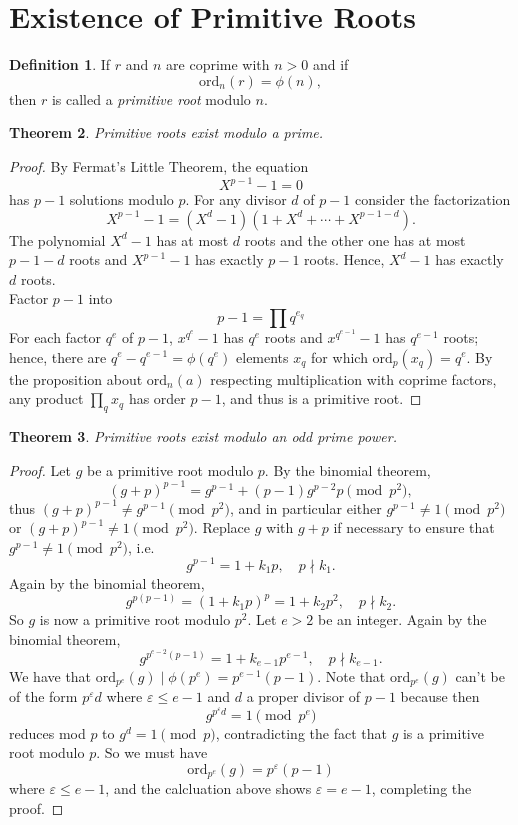 \documentclass{amsbook}
\numberwithin{section}{chapter}
\theoremstyle{plain}
\newtheorem{thm}{Theorem}[section]
\theoremstyle{definition}
\newtheorem{defn}[thm]{Definition}
\def\br{~\\[1em]}
\def\ord{\text{ord}}
\def\eps{\varepsilon}
\begin{document}
\section{Existence of Primitive Roots}
\begin{defn}
If $r$ and $n$ are coprime with $n > 0$ and if
\[\ord_n(r) = \phi(n),\]
then $r$ is called a \textit{primitive root} modulo $n$.
\end{defn}
\begin{thm}
Primitive roots exist modulo a prime.
\end{thm}
\begin{proof}
By Fermat's Little Theorem, the equation
\[X^{p-1} - 1 = 0\]
has $p - 1$ solutions modulo $p$.
For any divisor $d$ of $p - 1$ consider the factorization
\[X^{p-1} - 1 = (X^d - 1)(1 + X^d +\cdots + X^{p - 1 - d}).\]
The polynomial $X^d - 1$ has at most $d$ roots and the other
one has at most $p - 1 - d$ roots and $X^{p-1} - 1$ has
exactly $p - 1$ roots. Hence, $X^d - 1$ has exactly $d$ roots.
\br
Factor $p - 1$ into
\[p - 1 = \prod q^{e_q}\]
For each factor $q^e$ of $p - 1$, $x^{q^e} - 1$ has $q^e$ roots
and $x^{q^{e - 1}} - 1$ has $q^{e - 1}$ roots; hence,
there are $q^e - q^{e - 1} = \phi(q^e)$ elements $x_q$ for which
$\ord_p(x_q) = q^e$.
By the proposition about $\ord_n(a)$ respecting multiplication
with coprime factors,
any product $\prod_q x_q$ has order $p - 1$, and thus is a primitive
root.
\end{proof}
\begin{thm}
Primitive roots exist modulo an odd prime power.
\end{thm}
\begin{proof}
Let $g$ be a primitive root modulo $p$.
By the binomial theorem,
\[(g + p)^{p - 1} = g^{p-1} + (p-1)g^{p-2}p\pmod{p^2},\]
thus $(g + p)^{p-1}\ne g^{p-1}\pmod{p^2}$,
and in particular either $g^{p-1}\ne 1\pmod{p^2}$ or
$(g+p)^{p-1}\ne 1\pmod{p^2}$. Replace $g$ with $g + p$
if necessary to ensure that $g^{p-1}\ne 1\pmod{p^2}$, i.e.
\[g^{p-1} = 1 + k_1p,\quad p\nmid k_1.\]
Again by the binomial theorem,
\[g^{p(p-1)} = (1 + k_1p)^p = 1 + k_2p^2,\quad p\nmid k_2.\]
So $g$ is now a primitive root modulo $p^2$. Let $e > 2$ be
an integer. Again
by the binomial theorem,
\[g^{p^{e-2}(p-1)} = 1 + k_{e-1}p^{e-1},\quad p\nmid k_{e-1}.\]
We have that $\ord_{p^e}(g)\mid\phi(p^e) = p^{e-1}(p-1)$. Note
that $\ord_{p^e}(g)$ can't be of the form $p^{\eps}d$
where $\eps\le e - 1$ and $d$ a proper divisor of $p -1$
because
then \[g^{p^\eps d} = 1\pmod{p^e}\] reduces mod $p$ to $g^d = 1\pmod p$,
contradicting the fact that $g$ is a primitive root modulo $p$.
So we must have \[\ord_{p^e}(g) = p^\eps(p-1)\] where $\eps\le e - 1$,
and the calcluation above shows $\eps = e - 1$, completing
the proof.
\end{proof}
\end{document}
